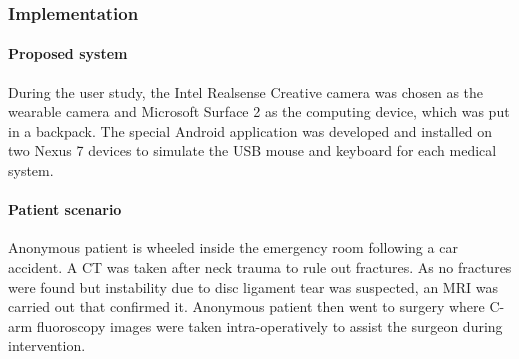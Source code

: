 {%
\subsubsection{Implementation}
\paragraph{Proposed system} 
During the user study, the Intel Realsense Creative camera was chosen as the wearable camera and Microsoft Surface 2 as the computing device, which was put in a backpack. The special Android application was developed and installed on two Nexus 7 devices to simulate the USB mouse and keyboard for each medical system. 
 
\paragraph{Patient scenario}}Anonymous patient is wheeled inside the emergency room following a car accident. A CT was taken after neck trauma to rule out fractures. As no fractures were found but instability due to disc ligament tear was suspected, an MRI was carried out that confirmed it. Anonymous patient then went to surgery where C-arm fluoroscopy images were taken intra-operatively to assist the surgeon during intervention.

